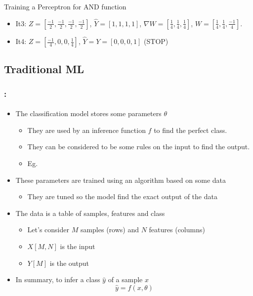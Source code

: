 \documentclass[xcolor=table]{beamer}
\begin{document}
\begin{frame}
\begin{exampleblock}{Training a Perceptron for AND function}
\begin{minipage}{0.79\textwidth}
\begin{itemize}
				\item It3: $ Z = [\frac{-1}{2}, \frac{-1}{2}, \frac{-1}{2}, \frac{-1}{2}] $, 
				$ \hat{Y} = [1, 1, 1, 1] $, 
				$ \nabla W = [\frac{1}{4}, \frac{1}{4}, \frac{1}{4}] $,
				$ W = [\frac{1}{4}, \frac{1}{4}, \frac{-1}{4}] $.
				
				\item It4: $ Z = [\frac{-1}{4}, 0, 0, \frac{1}{4}] $, 
				$ \hat{Y} = Y = [0, 0, 0, 1] $ (STOP)
			\end{itemize}
		\end{minipage}
	\end{exampleblock}
	
\end{frame}

\subsection{Traditional ML}

\begin{frame}
	\frametitle{\insertshortsubtitle: \insertsection}
	\framesubtitle{\insertsubsection}

	\begin{itemize}
		\item The classification model stores some parameters $\theta$
		\begin{itemize}
			\item They are used by an inference function $ f $ to find the perfect class.
			\item They can be considered to be some rules on the input to find the output.
			\item Eg. 
		\end{itemize}
		\item These parameters are trained using an algorithm based on some data
		\begin{itemize}
			\item They are tuned so the model find the exact output of the data
		\end{itemize}
		\item The data is a table of samples, features and class
		\begin{itemize}
			\item Let's consider $ M $ samples (rows) and $ N $ features (columns)
			\item $ X[M, N] $ is the input
			\item $ Y[M] $ is the output
		\end{itemize}
		\item In summary, to infer a class $ \hat{y} $ of a sample $ x $
		\[\hat{y} = f(x, \theta)\]
	\end{itemize}
	
\end{frame}
\end{document}
